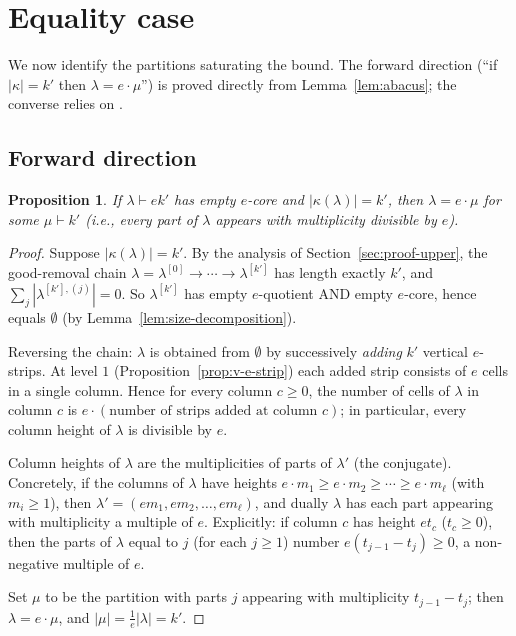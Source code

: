 \documentclass[11pt]{article}
\newtheorem{proposition}[theorem]{Proposition}
\theoremstyle{definition}
\begin{document}
\section{Equality case}
\label{sec:equality}

We now identify the partitions saturating the bound. The forward direction
(``if $|\kappa| = k'$ then $\lambda = e \cdot \mu$'') is proved directly from
Lemma~\ref{lem:abacus}; the converse relies on \cite[Prop.~3.12(2)]{Gerber}.

\subsection{Forward direction}

\begin{proposition}
\label{prop:forward}
If $\lambda \vdash ek'$ has empty $e$-core and $|\kappa(\lambda)| = k'$, then
$\lambda = e \cdot \mu$ for some $\mu \vdash k'$ (i.e., every part of $\lambda$
appears with multiplicity divisible by $e$).
\end{proposition}

\begin{proof}
Suppose $|\kappa(\lambda)| = k'$. By the analysis of Section~\ref{sec:proof-upper},
the good-removal chain $\lambda = \lambda^{[0]} \to \cdots \to \lambda^{[k']}$
has length exactly $k'$, and $\sum_j |\lambda^{[k'], (j)}| = 0$. So
$\lambda^{[k']}$ has empty $e$-quotient AND empty $e$-core, hence equals
$\emptyset$ (by Lemma~\ref{lem:size-decomposition}).

Reversing the chain: $\lambda$ is obtained from $\emptyset$ by successively
\emph{adding} $k'$ vertical $e$-strips. At level $1$
(Proposition~\ref{prop:v-e-strip}) each added strip consists of $e$ cells
in a single column. Hence for every column $c \ge 0$, the number of cells of
$\lambda$ in column $c$ is $e \cdot (\text{number of strips added at column } c)$;
in particular, every column height of $\lambda$ is divisible by $e$.

Column heights of $\lambda$ are the multiplicities of parts of $\lambda'$
(the conjugate). Concretely, if the columns of $\lambda$ have heights
$e \cdot m_1 \ge e \cdot m_2 \ge \cdots \ge e \cdot m_\ell$ (with $m_i \ge 1$),
then $\lambda' = (e m_1, e m_2, \ldots, e m_\ell)$, and dually $\lambda$ has
each part appearing with multiplicity a multiple of $e$. Explicitly: if
column $c$ has height $e t_c$ ($t_c \ge 0$), then the parts of $\lambda$
equal to $j$ (for each $j \ge 1$) number $e (t_{j-1} - t_j) \ge 0$, a
non-negative multiple of $e$.

Set $\mu$ to be the partition with parts $j$ appearing with multiplicity
$t_{j-1} - t_j$; then $\lambda = e \cdot \mu$, and $|\mu| = \frac{1}{e}|\lambda|
= k'$.
\end{proof}
\end{document}

